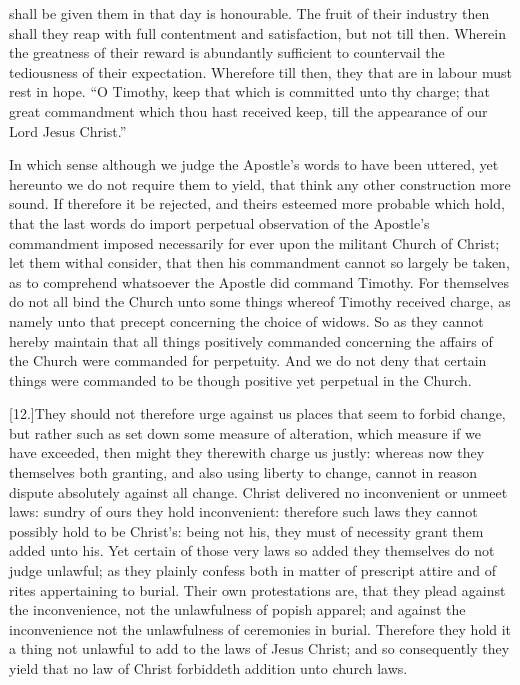 shall be given them in that day is honourable. The fruit of their industry then shall they reap with full contentment and satisfaction, but not till then. Wherein the greatness of their reward is abundantly sufficient to countervail the tediousness of their expectation. Wherefore till then, they that are in labour must rest in hope. “O Timothy, keep that which is committed unto thy charge; that great commandment which thou hast received keep, till the appearance of our Lord Jesus Christ.”

In which sense although we judge the Apostle’s words to have been uttered, yet hereunto we do not require them to yield, that think any other construction more sound. If therefore it be rejected, and theirs esteemed more probable which hold, that the last words do import perpetual observation of the Apostle’s commandment imposed necessarily for ever upon the militant Church of Christ; let them withal consider, that then his commandment cannot so largely be taken, as to comprehend whatsoever the Apostle did command Timothy. For themselves do not all bind the Church unto  some things whereof Timothy received charge, as namely unto that precept concerning the choice of widows. So as they cannot hereby maintain that all things positively commanded concerning the affairs of the Church were commanded for perpetuity. And we do not deny that certain things were commanded to be though positive yet perpetual in the Church.

[12.]They should not therefore urge against us places that seem to forbid change, but rather such as set down some measure of alteration, which measure if we have exceeded, then might they therewith charge us justly: whereas now they themselves both granting, and also using liberty to change, cannot in reason dispute absolutely against all change. Christ delivered no inconvenient or unmeet laws: sundry of ours they hold inconvenient: therefore such laws they cannot possibly hold to be Christ’s: being not his, they must of necessity grant them added unto his. Yet certain of those very laws so added they themselves do not judge unlawful; as they plainly confess both in matter of prescript attire and of rites appertaining to burial. Their own protestations are, that they plead against the inconvenience, not the unlawfulness of popish apparel; and against the inconvenience not the unlawfulness of ceremonies in burial. Therefore they hold it a thing not unlawful to add to the laws of Jesus Christ; and so consequently they yield that no law of Christ forbiddeth addition unto church laws.

